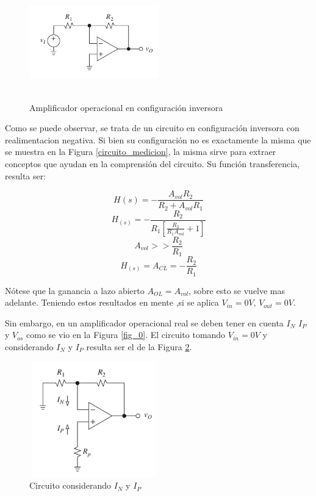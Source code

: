 \documentclass[12pt,a4paper]{article}
\begin{document}
\begin{figure}[ht]                                                       
    \centering\includegraphics[width=0.5\textwidth, height=5cm]{Figuras/fig_1.png}
     \caption{Amplificador operacional en configuración inversora}
     \label{inverter}
     \end{figure}

Como se puede observar, se trata de un circuito en configuración inversora con realimentacion negativa. Si bien su configuración no es exactamente la misma que se muestra en la Figura \ref{circuito_medicion}, la misma sirve para extraer conceptos que ayudan en la comprensión del circuito.
Su función transferencia, resulta ser:

\begin{displaymath} H(s) = -\frac{A_{vol} R_2}{R_2 + A_{vol} R_1} \end{displaymath}
\begin{displaymath} H_(s) = - \frac{R_2}{R_1 [\frac{R_2}{R_1 A_{vol}}+1]} \end{displaymath}
\begin{displaymath} A_{vol} >> \frac{R_2}{R_1} \end{displaymath}  
\begin{equation}  H_(s) = A_{CL} = - \frac{R_2}{R_1} \label{ganancia_OA_2}\end{equation}

Nótese que la ganancia a lazo abierto $A_{OL} = A_{vol}$, sobre esto se vuelve mas adelante.
Teniendo estos resultados en mente ,si se aplica $V_{in} = 0V$, $V_{out} = 0V$.

Sin embargo, en un amplificador operacional real se deben tener en cuenta $I_N$ $I_P$ y $V_{os}$ como se vio en la Figura \ref{fig_0}. El circuito tomando $V_{in} = 0V$ y considerando $I_N$ y $I_P$ resulta ser el de la 
Figura \ref{fig_2}.

\begin{figure}[ht]                                                       
    \centering\includegraphics[width=0.5\textwidth, height=5cm]{Figuras/fig_2.png}
     \caption{Circuito considerando $I_N$ y $I_P$}
     \label{fig_2}
     \end{figure}
\end{document}
